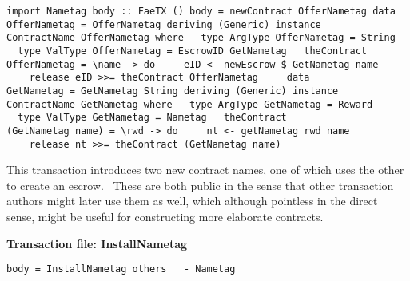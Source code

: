 \documentclass[11pt]{article}
\newcommand{\codeblock}[1]{\begin{mdframed}[
    backgroundcolor=header-color,
    linecolor=header-color,
    innertopmargin=10pt,
    ]{\texttt{#1}}\end{mdframed}}
\begin{document}
\codeblock{import Nametag\newline
\newline
body :: FaeTX ()\newline
body = newContract OfferNametag\newline
\newline
data OfferNametag = OfferNametag deriving (Generic)\newline
\newline
instance ContractName OfferNametag where\newline
  type ArgType OfferNametag = String\newline
  type ValType OfferNametag = EscrowID GetNametag\newline
  theContract OfferNametag = \textbackslash{}name -\textgreater{} do\newline
    eID \textless{}- newEscrow \$ GetNametag name\newline
    release eID \textgreater{}\textgreater{}= theContract OfferNametag\newline
    \newline
data GetNametag = GetNametag String deriving (Generic)\newline
\newline
instance ContractName GetNametag where\newline
  type ArgType GetNametag = Reward\newline
  type ValType GetNametag = Nametag\newline
  theContract (GetNametag name) = \textbackslash{}rwd -\textgreater{} do\newline
    nt \textless{}- getNametag rwd name\newline
    release nt \textgreater{}\textgreater{}= theContract (GetNametag name)}

This transaction introduces two new contract names, one of which uses the other to create an escrow.  These are both public in the sense that other transaction authors might later use them as well, which although pointless in the direct sense, might be useful for constructing more elaborate contracts.


\vspace{11pt}

\textbf{Transaction file: InstallNametag}

\codeblock{body = InstallNametag\newline
others\newline
  - Nametag}
\end{document}

